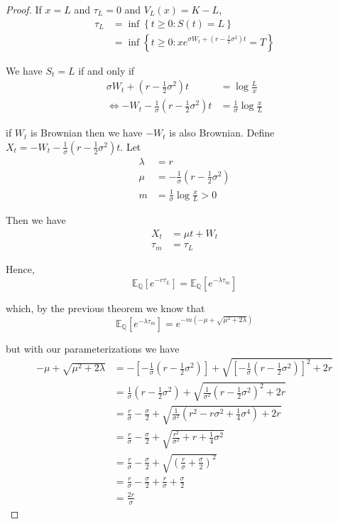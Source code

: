 \documentclass[12pt]{article}
\newcommand{\Q}{\mathbb Q}
\newcommand{\E}{\mathbb E}
\begin{document}
\begin{proof} If $x = L$ and $\tau_L = 0$ and $V_L(x) = K - L$,
\begin{align*}
	\tau_L &= \inf \left\{ t \geq 0: S(t) = L \right\} \\
	&= \inf \left\{ t \geq 0: xe^{\sigma W_t + (r - \frac{1}{2}\sigma^2)t} = T \right\}
\end{align*}

We have $S_t = L$ if and only if
\begin{align*}
	\sigma W_t + \left( r - \frac{1}{2}\sigma^2 \right) t &= \log \frac{L}{x} \\
	\iff  -W_t - \frac{1}{\sigma} \left( r - \frac{1}{2}\sigma^2 \right)t &= \frac{1}{\sigma} \log \frac{x}{L}
\end{align*}

if $W_t$ is Brownian then we have $-W_t$ is also Brownian. Define $X_t = -W_t - \frac{1}{\sigma}\left( r - \frac{1}{2}\sigma^2 \right)t$. Let 
\begin{align*}
	\lambda &= r \\
	\mu &= -\frac{1}{\sigma} \left( r - \frac{1}{2}\sigma^2 \right) \\
	m &= \frac{1}{\sigma} \log \frac{x}{L} > 0
\end{align*}

Then we have
\begin{align*}
	X_t &= \mu t + W_t \\
	\tau_m &= \tau_L
\end{align*}

Hence,
\begin{equation*}
	\E_\Q \left[ e^{-r \tau_L } \right] = \E_\Q \left[ e^{-\lambda \tau_m } \right]
\end{equation*}

which, by the previous theorem we know that
\begin{equation*}
	\E_\Q \left[ e^{-\lambda \tau_m } \right] = e^{ -m(-\mu + \sqrt{\mu^2 + 2\lambda} )}
\end{equation*}

but with our parameterizations we have
\begin{align*}
	-\mu + \sqrt{\mu^2 + 2\lambda} &= -\left[ -\frac{1}{\sigma}\left(r - \frac{1}{2}\sigma^2 \right)\right] + \sqrt{\left[ -\frac{1}{\sigma} \left( r - \frac{1}{2}\sigma^2 \right) \right]^2 + 2r} \\
	&= \frac{1}{\sigma}\left(r - \frac{1}{2}\sigma^2 \right) + \sqrt{ \frac{1}{\sigma^2} \left( r - \frac{1}{2}\sigma^2 \right)^2 + 2r} \\
	&= \frac{r}{\sigma} - \frac{\sigma}{2} + \sqrt{ \frac{1}{\sigma^2} \left( r^2 - r\sigma^2 + \frac{1}{4}\sigma^4 \right) + 2r} \\
	&= \frac{r}{\sigma} - \frac{\sigma}{2} + \sqrt{ \frac{r^2}{\sigma^2} + r + \frac{1}{4}\sigma^2} \\
	&= \frac{r}{\sigma} - \frac{\sigma}{2} + \sqrt{ \left( \frac{r}{\sigma} + \frac{\sigma}{2} \right)^2  } \\
	&= \frac{r}{\sigma} - \frac{\sigma}{2} + \frac{r}{\sigma} + \frac{\sigma}{2} \\
	&= \frac{2r}{\sigma}
\end{align*}


\end{proof}
\end{document}
